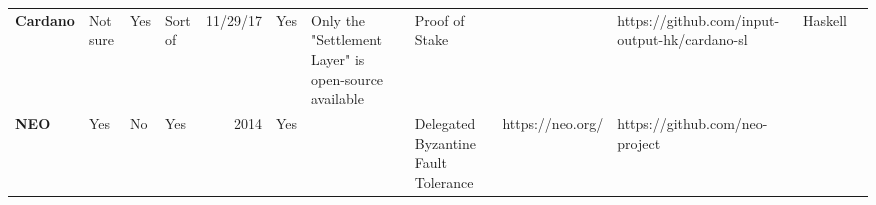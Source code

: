 \begin{table}[ht]
\begin{adjustbox}{width=25cm, height=6cm, angle=270}
\begin{tabular}{llllrlp{17.915em}rlrrr}
      \rowcolor[rgb]{ .267,  .447,  .769} \textcolor[rgb]{ 1,  1,  1}{\textbf{Cardano}} & \cellcolor[rgb]{ 1,  .922,  .612}\textcolor[rgb]{ .612,  .341,  0}{Not sure} & \cellcolor[rgb]{ .776,  .937,  .808}\textcolor[rgb]{ 0,  .38,  0}{Yes} & \cellcolor[rgb]{ 1,  .922,  .612}\textcolor[rgb]{ .612,  .341,  0}{Sort of} & \cellcolor[rgb]{ .851,  .882,  .949}\textcolor[rgb]{ .188,  .329,  .588}{11/29/17} & \cellcolor[rgb]{ .776,  .937,  .808}\textcolor[rgb]{ 0,  .38,  0}{Yes} & \cellcolor[rgb]{ .851,  .882,  .949}\textcolor[rgb]{ .188,  .329,  .588}{Only the "Settlement Layer" is open-source available} & \multicolumn{1}{l}{\cellcolor[rgb]{ .851,  .882,  .949}\textcolor[rgb]{ .188,  .329,  .588}{Proof of Stake}} & \cellcolor[rgb]{ .851,  .882,  .949}\textcolor[rgb]{ .188,  .329,  .588}{} & \multicolumn{1}{l}{\cellcolor[rgb]{ .851,  .882,  .949}\textcolor[rgb]{ .188,  .329,  .588}{https://github.com/input-output-hk/cardano-sl }} & \multicolumn{1}{l}{\cellcolor[rgb]{ .851,  .882,  .949}\textcolor[rgb]{ .188,  .329,  .588}{Haskell}} & \cellcolor[rgb]{ .851,  .882,  .949}\textcolor[rgb]{ .188,  .329,  .588}{} \\
      \rowcolor[rgb]{ .267,  .447,  .769} \textcolor[rgb]{ 1,  1,  1}{\textbf{NEO}} & \cellcolor[rgb]{ .776,  .937,  .808}\textcolor[rgb]{ 0,  .38,  0}{Yes} & \cellcolor[rgb]{ 1,  .78,  .808}\textcolor[rgb]{ .612,  0,  .024}{No} & \cellcolor[rgb]{ .776,  .937,  .808}\textcolor[rgb]{ 0,  .38,  0}{Yes} & \cellcolor[rgb]{ 1,  1,  1}\textcolor[rgb]{ .188,  .329,  .588}{2014} & \cellcolor[rgb]{ .776,  .937,  .808}\textcolor[rgb]{ 0,  .38,  0}{Yes} & \multicolumn{1}{r}{\cellcolor[rgb]{ 1,  1,  1}\textcolor[rgb]{ .188,  .329,  .588}{}} & \multicolumn{1}{l}{\cellcolor[rgb]{ 1,  1,  1}\textcolor[rgb]{ .188,  .329,  .588}{Delegated Byzantine Fault Tolerance}} & \cellcolor[rgb]{ 1,  1,  1}\textcolor[rgb]{ .188,  .329,  .588}{https://neo.org/} & \multicolumn{1}{l}{\cellcolor[rgb]{ 1,  1,  1}\textcolor[rgb]{ .188,  .329,  .588}{https://github.com/neo-project}} & \cellcolor[rgb]{ 1,  1,  1}\textcolor[rgb]{ .188,  .329,  .588}{} & \cellcolor[rgb]{ 1,  1,  1}\textcolor[rgb]{ .188,  .329,  .588}{} \\

\end{tabular}
\end{adjustbox}
\end{table}

